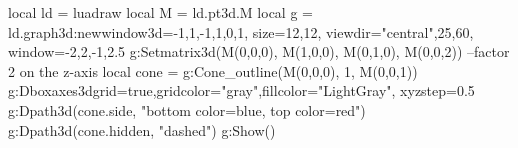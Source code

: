 \documentclass{standalone} %
\begin{document}
\begin{luadraw}{}
local ld = luadraw
local M = ld.pt3d.M
local g = ld.graph3d:new{window3d={-1,1,-1,1,0,1}, size={12,12}, 
    viewdir={"central",25,60}, window={-2,2,-1,2.5} }
g:Setmatrix3d({M(0,0,0), M(1,0,0), M(0,1,0), M(0,0,2)}) --factor 2 on the z-axis
local cone = g:Cone_outline(M(0,0,0), 1, M(0,0,1))
g:Dboxaxes3d{grid=true,gridcolor="gray",fillcolor="LightGray", xyzstep=0.5}
g:Dpath3d(cone.side, "bottom color=blue, top color=red")
g:Dpath3d(cone.hidden, "dashed")
g:Show()
\end{luadraw}
\end{document}
